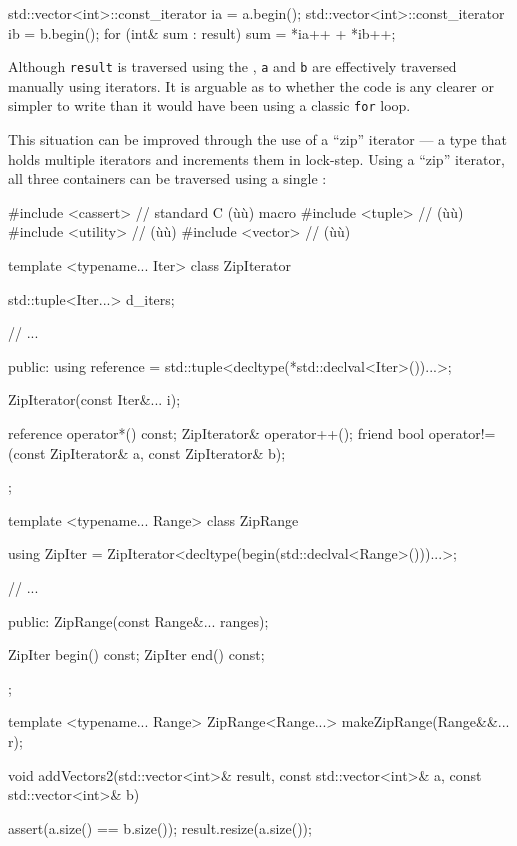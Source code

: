 {{{\begin{emcppslisting}
{    std::vector<int>::const_iterator ia = a.begin();
    std::vector<int>::const_iterator ib = b.begin();
    for (int& sum : result)
    {
        sum = *ia++ + *ib++;
    }
}
\end{emcppslisting}
    

\noindent Although \lstinline!result! is traversed using the , \lstinline!a! and \lstinline!b! are effectively traversed
manually using iterators. It is arguable as to whether the code is any
clearer or simpler to write than it would have been using a classic
\lstinline!for! loop.

This situation can be improved through the use of a ``zip'' iterator ---
a type that holds multiple iterators and increments them in lock-step.
Using a ``zip'' iterator, all three containers can be traversed using a
single :

\begin{emcppslisting}
#include <cassert>  // standard C (ù{}ù) macro
#include <tuple>    // (ù{}ù)
#include <utility>  // (ù{}ù)
#include <vector>   // (ù{}ù)

template <typename... Iter>
class ZipIterator
{
    std::tuple<Iter...> d_iters;

    // ...

public:
    using reference = std::tuple<decltype(*std::declval<Iter>())...>;

    ZipIterator(const Iter&... i);

    reference operator*() const;
    ZipIterator& operator++();
    friend bool operator!=(const ZipIterator& a, const ZipIterator& b);
};

template <typename... Range>
class ZipRange
{
    using ZipIter =
        ZipIterator<decltype(begin(std::declval<Range>()))...>;

    // ...

public:
    ZipRange(const Range&... ranges);

    ZipIter begin() const;
    ZipIter end() const;
};

template <typename... Range>
ZipRange<Range...> makeZipRange(Range&&... r);

void addVectors2(std::vector<int>&       result,
                 const std::vector<int>& a,
                 const std::vector<int>& b)
{
    assert(a.size() == b.size());
    result.resize(a.size());

}
\end{emcppslisting}}}}
